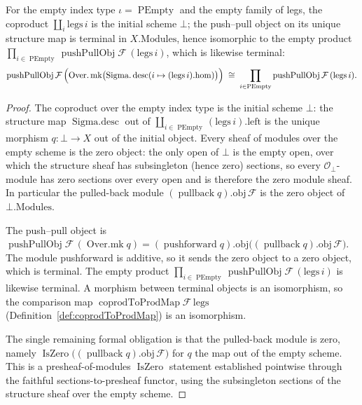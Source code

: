 \begin{lemma}
  \label{lem:pushPull_coprod_prod_empty}
  For the empty index type \(\iota = \operatorname{PEmpty}\) and the empty family of legs, the coproduct
  \(\coprod_{i} \mathrm{legs}\,i\) is the initial scheme \(\bot\); the push--pull object on its unique
  structure map is terminal in \(X.\mathrm{Modules}\), hence isomorphic to the empty product
  \(\prod_{i \in \operatorname{PEmpty}} \operatorname{pushPullObj}\mathcal{F}\,(\mathrm{legs}\,i)\),
  which is likewise terminal:
  \[
    \operatorname{pushPullObj}\mathcal{F}\,\Bigl(\operatorname{Over.mk}\bigl(
      \operatorname{Sigma.desc}(i \mapsto (\mathrm{legs}\,i).\mathrm{hom})\bigr)\Bigr)
      \;\cong\;
    \prod_{i \in \operatorname{PEmpty}} \operatorname{pushPullObj}\mathcal{F}\,(\mathrm{legs}\,i).
  \]
\end{lemma}
\begin{proof}
  The coproduct over the empty index type is the initial scheme \(\bot\): the structure map
  \(\operatorname{Sigma.desc}\) out of \(\coprod_{i \in \operatorname{PEmpty}} (\mathrm{legs}\,i).
  \mathrm{left}\) is the unique morphism \(q : \bot \to X\) out of the initial object. Every sheaf of
  modules over the empty scheme is the zero object: the only open of \(\bot\) is the empty open, over
  which the structure sheaf has subsingleton (hence zero) sections, so every
  \(\mathcal{O}_\bot\)-module has zero sections over every open and is therefore the zero module sheaf.
  In particular the pulled-back module \((\operatorname{pullback} q).\mathrm{obj}\,\mathcal{F}\) is the
  zero object of \(\bot.\mathrm{Modules}\).

  The push--pull object is \(\operatorname{pushPullObj}\mathcal{F}\,(\operatorname{Over.mk} q) =
  (\operatorname{pushforward} q).\mathrm{obj}\bigl((\operatorname{pullback} q).\mathrm{obj}\,
  \mathcal{F}\bigr)\). The module pushforward is additive, so it sends the zero object to a zero
  object, which is terminal. The empty product \(\prod_{i \in \operatorname{PEmpty}}
  \operatorname{pushPullObj}\mathcal{F}\,(\mathrm{legs}\,i)\) is likewise terminal. A morphism between
  terminal objects is an isomorphism, so the comparison map
  \(\operatorname{coprodToProdMap}\mathcal{F}\,\mathrm{legs}\) (Definition~\ref{def:coprodToProdMap}) is
  an isomorphism.

  The single remaining formal obligation is that the pulled-back module is zero, namely
  \(\operatorname{IsZero}\bigl((\operatorname{pullback} q).\mathrm{obj}\,\mathcal{F}\bigr)\) for \(q\)
  the map out of the empty scheme. This is a presheaf-of-modules \(\operatorname{IsZero}\) statement
  established pointwise through the faithful sections-to-presheaf functor, using the subsingleton
  sections of the structure sheaf over the empty scheme.
\end{proof}

